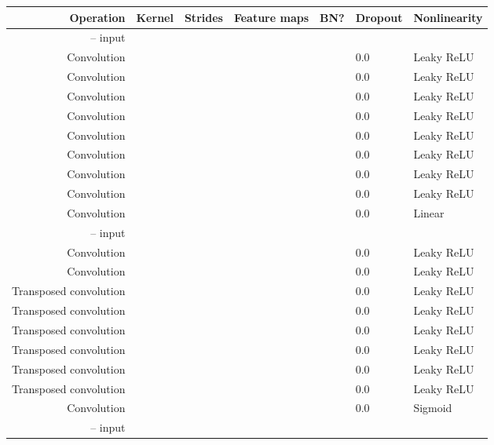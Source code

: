 \documentclass{article}
\begin{document}
\begin{table}[h]
\centering
\begin{tabular}{@{}rllllll@{}} \toprule
Operation              & Kernel       & Strides      & Feature maps & BN?          & Dropout & Nonlinearity \\ \midrule
 --  input                                                                 \\
Convolution            &  &  &          &       & 0.0     & Leaky ReLU \\
Convolution            &  &  &          &       & 0.0     & Leaky ReLU \\
Convolution            &  &  &         &       & 0.0     & Leaky ReLU \\
Convolution            &  &  &         &       & 0.0     & Leaky ReLU \\
Convolution            &  &  &         &       & 0.0     & Leaky ReLU \\
Convolution            &  &  &         &       & 0.0     & Leaky ReLU \\
Convolution            &  &  &        &       & 0.0     & Leaky ReLU \\
Convolution            &  &  &        &       & 0.0     & Leaky ReLU \\
Convolution            &  &  &         &      & 0.0     & Linear     \\
 --  input                                                                 \\
Convolution            &  &  &        &       & 0.0     & Leaky ReLU \\
Convolution            &  &  &         &       & 0.0     & Leaky ReLU \\
Transposed convolution &  &  &         &       & 0.0     & Leaky ReLU \\
Transposed convolution &  &  &         &       & 0.0     & Leaky ReLU \\
Transposed convolution &  &  &         &       & 0.0     & Leaky ReLU \\
Transposed convolution &  &  &          &       & 0.0     & Leaky ReLU \\
Transposed convolution &  &  &          &       & 0.0     & Leaky ReLU \\
Transposed convolution &  &  &          &       & 0.0     & Leaky ReLU \\
Convolution            &  &  &           &      & 0.0     & Sigmoid    \\
 --  input                                                                   \\

\end{tabular}
\end{table}
\end{document}
